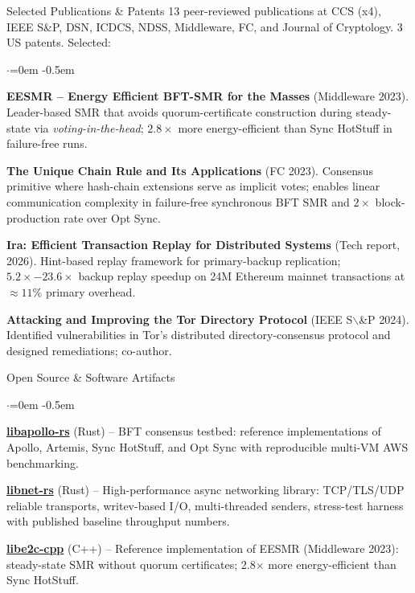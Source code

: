 \documentclass{resume}
\begin{document}
\begin{rSection}{Selected Publications \& Patents}
\label{sec:org109eee2}
\vspace{0.5em}
13 peer-reviewed publications at CCS (x4), IEEE S\&P, DSN, ICDCS, NDSS, Middleware, FC, and Journal of Cryptology. 3 US patents. Selected:
\begin{list}{$\cdot$}{\leftmargin=0em}
\itemsep -0.5em \vspace{-0.5em}
 \item  \textbf{EESMR -- Energy Efficient BFT-SMR for the Masses} (Middleware 2023). Leader-based SMR that avoids quorum-certificate construction during steady-state via \emph{voting-in-the-head}; \(2.8\times\) more energy-efficient than Sync HotStuff in failure-free runs.
 \item  \textbf{The Unique Chain Rule and Its Applications} (FC 2023). Consensus primitive where hash-chain extensions serve as implicit votes; enables linear communication complexity in failure-free synchronous BFT SMR and \(2\times\) block-production rate over Opt Sync.
 \item  \textbf{Ira: Efficient Transaction Replay for Distributed Systems} (Tech report, 2026). Hint-based replay framework for primary-backup replication; \(5.2\times-23.6\times\) backup replay speedup on 24M Ethereum mainnet transactions at \(\approx11\%\) primary overhead.
 \item  \textbf{Attacking and Improving the Tor Directory Protocol} (IEEE S$\backslash$&P 2024). Identified vulnerabilities in Tor's distributed directory-consensus protocol and designed remediations; co-author.
\end{list}
\vspace{0.5em}
\end{rSection}
\begin{rSection}{Open Source \& Software Artifacts}
\label{sec:orgd53ec68}
\vspace{0.5em}
\begin{list}{$\cdot$}{\leftmargin=0em}
\itemsep -0.5em \vspace{-0.5em}
 \item  \textbf{\href{https://github.com/libdist-rs/libapollo-rs}{libapollo-rs}} (Rust) -- BFT consensus testbed: reference implementations of Apollo, Artemis, Sync HotStuff, and Opt Sync with reproducible multi-VM AWS benchmarking.
 \item  \textbf{\href{https://github.com/libdist-rs/libnet-rs}{libnet-rs}} (Rust) -- High-performance async networking library: TCP/TLS/UDP reliable transports, writev-based I/O, multi-threaded senders, stress-test harness with published baseline throughput numbers.
 \item  \textbf{\href{https://github.com/adithyabhatkajake/libe2c-cpp}{libe2c-cpp}} (C++) -- Reference implementation of EESMR (Middleware 2023): steady-state SMR without quorum certificates; 2.8\(\times\) more energy-efficient than Sync HotStuff.
\end{list}
\end{rSection}
\end{document}

